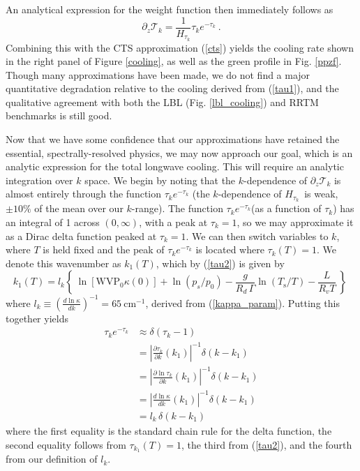 \documentclass[10pt]{article}
\newcommand{\beqn}{\begin{equation}}
\newcommand{\eeqn}{\end{equation}}
\newcommand{\eqnref}[1]{(\ref{#1})}
\newcommand{\n}{\nonumber}
\newcommand{\inverse}{^{-1}}
\newcommand{\partialderf}[2]{\ensuremath{\frac{\partial #1}{\partial #2}}}
\newcommand{\der}[2]{\ensuremath{\frac{d #1}{d #2}}}
\newcommand{\ppz}{\ensuremath{\partial_z}}
\newcommand{\trans}{\ensuremath{\mathcal{T}}}
\newcommand{\cminverse}{\ensuremath{\mathrm{cm^{-1}}}}
\newcommand{\Ts}{\ensuremath{T_\mathrm{s}}}
\newcommand{\ps}{\ensuremath{p_s}}
\newcommand{\WVP}{\ensuremath{\mathrm{WVP}}}
\newcommand{\Htauk}{\ensuremath{H_{\tau_k}}}
\begin{document}
		An analytical expression for the weight function then immediately follows as 
	\beqn
		\ppz \trans_k = \frac{1}{\Htauk} \tau_k e^{-\tau_k}  \ .
	\label{weight}
	\eeqn
 Combining this with the CTS approximation \eqnref{cts}  yields the cooling rate shown in the right panel of Figure \ref{cooling}, as well as the green profile in Fig. \ref{ppzf}.  Though many approximations have been made, we do not find  a major quantitative degradation relative to the cooling derived from \eqnref{tau1}, and the qualitative agreement with both the LBL (Fig. \ref{lbl_cooling}) and RRTM benchmarks is still good.

Now that we have some confidence that our approximations have retained the essential, spectrally-resolved physics,  we may now approach our goal, which is  an analytic expression for the total longwave cooling. This will require an analytic integration over $k$ space. We begin by noting that the $k$-dependence of $\ppz \trans_k$ is almost entirely through the function $\tau_k e^{-\tau_k}$ (the $k$-dependence of \Htauk\ is weak, $\pm 10 \%$ of the mean over our $k$-range).  The function $\tau_k e^{-\tau_k}$(as a function of $\tau_k$) has an integral of 1 across $(0,\infty)$, with a peak at $\tau_k=1$, so we may approximate it as a Dirac delta function peaked at $\tau_k=1$. We can then switch variables to $k$, where $T$ is held fixed and the peak of $\tau_k e^{-\tau_k}$ is located where	$\tau_{k}(T)=1$. We denote this wavenumber as $k_1(T)$, which by  \eqnref{tau2} is given by 
	\beqn
		k_1(T) =  l_k\left\{\ \ln[ \WVP_0\kappa(0)] + \ln(\ps/p_0) - \frac{g}{R_d\,\Gamma}\ln(\Ts/T) - \frac{L}{R_vT}\  \right\} \; 
	\label{k1}
	\eeqn
	where $l_k \equiv  (\der{\ln\kappa}{k})^{-1} = 65\ \cminverse$, derived from \eqnref{kappa_param}. Putting this together yields
	\begin{align}
		\tau_k e^{-\tau_k} & \approx \delta(\tau_k- 1)  \n \\
					    & = \left|\partialderf{\tau_k}{k}(k_1)\right|\inverse\delta(k-k_1) \n  \\
					    & =  \left|\partialderf{\ln\tau_k}{k}(k_1)\right|\inverse\delta(k-k_1) \n  \\ 
					    & =  \left|\der{\ln\kappa}{k}(k_1)\right|\inverse\delta(k-k_1) \n \\
					    & = l_k\,  \delta(k-k_1) \label{delta_approx}
	\end{align}
where the first equality is the standard chain rule for the delta function, the second equality follows from $\tau_{k_1}(T)=1$, the third from \eqnref{tau2}, and the fourth from our definition of  $l_k$.
\end{document}
